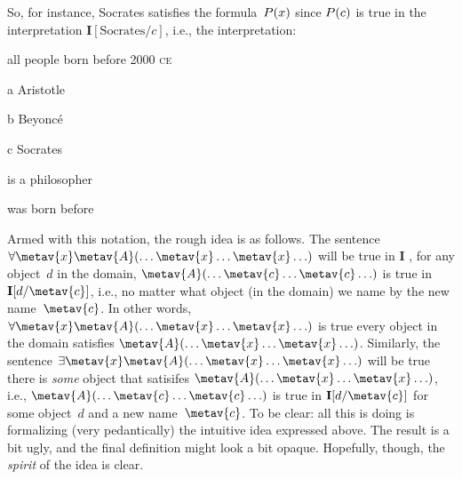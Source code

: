 So, for instance, Socrates satisfies the formula~$\mathord{P}(x)$ since $\mathord{P}(c)$ is true in the interpretation $\mathbf{I}[\text{Socrates}/c]$, i.e., the interpretation:
\begin{ekey}
	\item[\text{domain}] all people born before 2000 \textsc{ce}
	\item[a] Aristotle
	\item[b] Beyonc\'e
	\item[c] Socrates 
	\item[\atom{P}{x}]  is a philosopher
	\item[\atom{R}{x,y}]  was born before 
\end{ekey}

Armed with this notation, the rough idea is as follows. The sentence
$\forall \metav{x}\metav{A}(\ldots \metav{x} \ldots \metav{x} \ldots)$
will be true in $\mathbf{I}$ \ifeff, for any object~$d$ in the domain,
$\metav{A}(\ldots \metav{c} \ldots \metav{c}\ldots)$ is true in
$\mathbf{I}[d/\metav{c}]$, i.e., no matter what object (in the domain)
we name by the new name~$\metav{c}$. In other words, $\forall
\metav{x} \metav{A}(\ldots \metav{x} \ldots \metav{x} \ldots)$ is true
\ifeff{} every object in the domain satisfies $\metav{A}(\ldots
\metav{x} \ldots \metav{x} \ldots)$. Similarly, the sentence $\exists
\metav{x}\metav{A}(\ldots \metav{x} \ldots \metav{x} \ldots)$ will be
true \ifeff{} there is \emph{some} object that satisifes
$\metav{A}(\ldots \metav{x} \ldots \metav{x} \ldots)$, i.e.,
$\metav{A}(\ldots \metav{c} \ldots \metav{c} \ldots)$ is true in
$\mathbf{I}[d/\metav{c}]$ for some object~$d$ and a new
name~$\metav{c}$.
To be clear: all this is doing is formalizing (very pedantically) the intuitive idea expressed above. The result is a bit ugly, and the final definition might look a bit opaque. Hopefully, though, the \emph{spirit} of the idea is clear.

